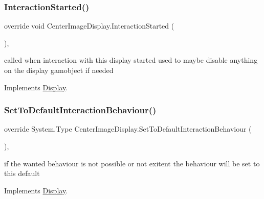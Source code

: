\subsubsection{\texorpdfstring{Interaction\+Started()}{InteractionStarted()}}
{\footnotesize\ttfamily override void Center\+Image\+Display.\+Interaction\+Started (\begin{DoxyParamCaption}{ }\end{DoxyParamCaption})\hspace{0.3cm}{\ttfamily [protected]}, {\ttfamily [virtual]}}



called when interaction with this display started used to maybe disable anything on the display gamobject if needed 



Implements \mbox{\hyperlink{class_display_a21c51fcf185403197a78a5acfd2065de}{Display}}.

\mbox{\label{class_center_image_display_ac6ddf9c8df99ff76c0f508ba4e45a217}} 
\subsubsection{\texorpdfstring{Set\+To\+Default\+Interaction\+Behaviour()}{SetToDefaultInteractionBehaviour()}}
{\footnotesize\ttfamily override System.\+Type Center\+Image\+Display.\+Set\+To\+Default\+Interaction\+Behaviour (\begin{DoxyParamCaption}{ }\end{DoxyParamCaption})\hspace{0.3cm}{\ttfamily [protected]}, {\ttfamily [virtual]}}



if the wanted behaviour is not possible or not exitent the behaviour will be set to this default 



Implements \mbox{\hyperlink{class_display_a81f07350cf50b3924f4fe269e1b4cf17}{Display}}.

\mbox{\label{class_center_image_display_a3da996020c7d8abcd24f35660945703a}} 
